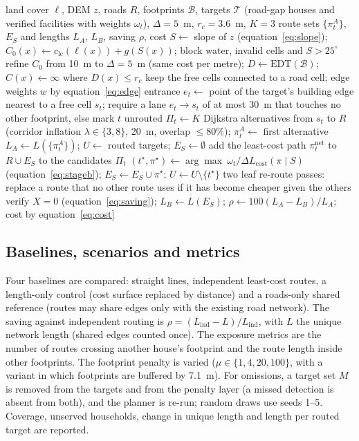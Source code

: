 \documentclass[12pt,a4paper]{article}
\newcommand{\Lcost}{L_{\mathrm{cost}}}
\begin{document}
\begin{algorithm}[t]
\caption{Cost surface with zero-crossing clearance and two-stage routing (\texttt{clearance.py}, \texttt{plan\_network\_v2.py})}
\label{alg:route}
\begin{algorithmic}[1]
\Require land cover $\ell$, DEM $z$, roads $R$, footprints $\mathcal B$, targets $\mathcal T$ (road-gap houses and verified facilities with weights $\omega_t$), $\Delta=5$~m, $r_c=3.6$~m, $K=3$
\Ensure route sets $\{\pi_t^A\}$, $E_S$ and lengths $L_A$, $L_B$, saving $\rho$, cost
\State $S\gets$ slope of $z$ (equation~\ref{eq:slope}); $C_0(x)\gets c_{\mathrm{lc}}(\ell(x))+g(S(x))$; block water, invalid cells and $S>25^{\circ}$
\State refine $C_0$ from 10~m to $\Delta=5$~m (same cost per metre); $D\gets\mathrm{EDT}(\mathcal B)$; $C(x)\gets\infty$ where $D(x)\le r_c$
\State keep the free cells connected to a road cell; edge weights $w$ by equation~\ref{eq:edge}
  \State entrance $e_t\gets$ point of the target's building edge nearest to a free cell $s_t$; require a lane $e_t\to s_t$ of at most 30~m that touches no other footprint, else mark $t$ unrouted
  \State $\Pi_t\gets K$ Dijkstra alternatives from $s_t$ to $R$ (corridor inflation $\lambda\in\{3,8\}$, 20~m, overlap $\le 80\%$); $\pi_t^A\gets$ first alternative
\EndFor
\State $L_A\gets L(\{\pi_t^A\})$; $U\gets$ routed targets; $E_S\gets\emptyset$
   add the least-cost path $\pi_t^{\mathrm{net}}$ to $R\cup E_S$ to the candidates $\Pi_t$ \EndFor
  \State $(t^\star,\pi^\star)\gets\arg\max\ \omega_t/\Delta\Lcost(\pi\mid S)$ (equation~\ref{eq:stageb}); $E_S\gets E_S\cup\pi^\star$; $U\gets U\setminus\{t^\star\}$
\EndWhile
\State two leaf re-route passes: replace a route that no other route uses if it has become cheaper given the others
\State verify $X=0$ (equation~\ref{eq:saving}); $L_B\gets L(E_S)$; $\rho\gets 100(L_A-L_B)/L_A$; cost by equation~\ref{eq:cost}
\end{algorithmic}
\end{algorithm}

\subsection{Baselines, scenarios and metrics}
Four baselines are compared: straight lines, independent least-cost routes, a length-only control (cost surface replaced by distance) and a roads-only shared reference (routes may share edges only with the existing road network). The saving against independent routing is $\rho=(L_{\mathrm{ind}}-L)/L_{\mathrm{ind}}$, with $L$ the unique network length (shared edges counted once). The exposure metrics are the number of routes crossing another house's footprint and the route length inside other footprints. The footprint penalty is varied ($\mu\in\{1,4,20,100\}$, with a variant in which footprints are buffered by 7.1~m). For omissions, a target set $M$ is removed from the targets and from the penalty layer (a missed detection is absent from both), and the planner is re-run; random draws use seeds 1--5. Coverage, unserved households, change in unique length and length per routed target are reported.
\end{document}
